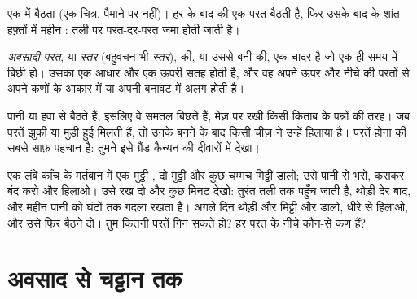\begin{omfigure}
{\small एक  में बैठता  (एक चित्र, पैमाने पर नहीं)। हर  के बाद  की
एक परत बैठती है, फिर उसके बाद के शांत हफ़्तों में महीन : तली पर परत-दर-परत
जमा होती जाती है।}
\label{fig:g7:sediments-and-fossils:lake}
\end{omfigure}

\begin{definition}\label{def:g7:sediments-and-fossils:layer}
\emph{अवसादी परत}, या \emph{स्तर} (बहुवचन भी
\emph{स्तर}),  की, या उससे बनी  की, एक चादर है जो एक ही समय में बिछी
हो। उसका एक आधार और एक ऊपरी सतह होती है, और वह अपने ऊपर और नीचे की परतों से
अपने कणों के आकार में या अपनी बनावट में
अलग होती है।
\end{definition}

 पानी या हवा से बैठते हैं, इसलिए वे समतल बिछते हैं, मेज़ पर रखी किसी किताब
के पन्नों की तरह। जब परतें झुकी या मुड़ी हुई मिलती हैं, तो उनके बनने के बाद किसी
चीज़ ने उन्हें हिलाया है। परतें होना  की सबसे साफ़ पहचान है: तुमने
इसे ग्रैंड कैन्यन की दीवारों में देखा।

\begin{inthelab}[मर्तबान में परतें (कक्षा में, अध्यापक के साथ)]
एक लंबे काँच के मर्तबान में एक मुट्ठी , दो मुट्ठी  और कुछ चम्मच मिट्टी
डालो; उसे पानी से भरो, कसकर बंद करो और हिलाओ। उसे रख दो और कुछ मिनट देखो: 
तुरंत तली तक पहुँच जाती है,  थोड़ी देर बाद, और महीन  पानी को घंटों तक
गदला रखता है। अगले दिन थोड़ी और मिट्टी और  डालो, धीरे से हिलाओ, और उसे फिर
बैठने दो। तुम कितनी परतें गिन सकते हो? हर परत के नीचे कौन-से कण
हैं?
\end{inthelab}

\section{अवसाद से चट्टान तक}

